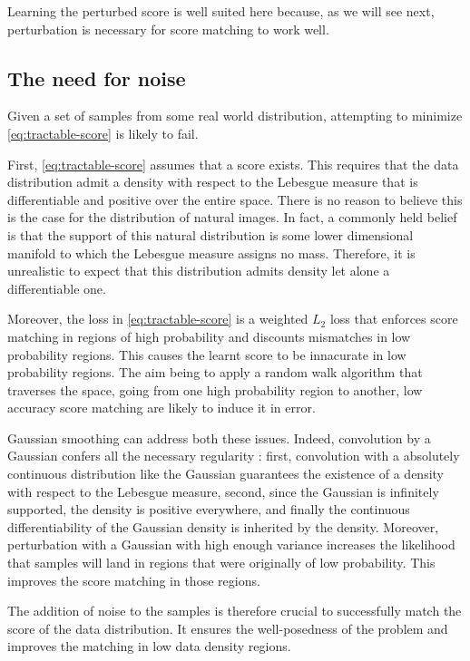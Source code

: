 \documentclass[11pt,twoside]{article}
\begin{document}
Learning the perturbed score is well suited here because, as we will see next, perturbation is necessary for score matching to work well.

\subsection{The need for noise}
\label{sec:noise}

Given a set of samples from some real world distribution, attempting to minimize \eqref{eq:tractable-score} is likely to fail.

First, \eqref{eq:tractable-score} assumes that a score exists. This requires that the data distribution admit a density with respect to the Lebesgue measure that is differentiable and positive over the entire space. There is no reason to believe this is the case for the distribution of natural images. In fact, a commonly held belief is that the support of this natural distribution is some lower dimensional manifold to which the Lebesgue measure assigns no mass. Therefore, it is unrealistic to expect that this distribution admits density let alone a differentiable one.

Moreover, the loss in \eqref{eq:tractable-score} is a weighted $L_2$ loss that enforces score matching in regions of high probability and discounts mismatches in low probability regions. This causes the learnt score to be innacurate in low probability regions. The aim being to apply a random walk algorithm that traverses the space, going from one high probability region to another, low accuracy score matching are likely to induce it in error. 

Gaussian smoothing can address both these issues. Indeed, convolution by a Gaussian confers all the necessary regularity : first, convolution with a absolutely continuous distribution like the Gaussian guarantees the existence of a density with respect to the Lebesgue measure, second, since the Gaussian is infinitely supported, the density is positive everywhere, and finally the continuous differentiability of the Gaussian density is inherited by the density. Moreover, perturbation with a Gaussian with high enough variance increases the likelihood that samples will land in regions that were originally of low probability. This improves the score matching in those regions.

The addition of noise to the samples is therefore crucial to successfully match the score of the data distribution. It ensures the well-posedness of the problem and improves the matching in low data density regions.
\end{document}
